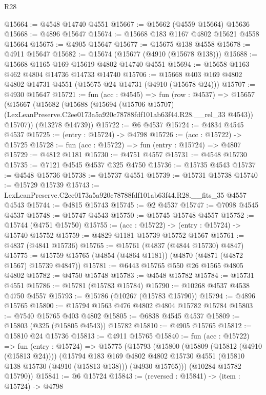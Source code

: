 \begin{lexlean}{R28}
\begin{coremodule}
@15664 := @4548 @14740 @4551
@15667 := @15662 (@4559 @15664) @15636
@15668 := @4896 @15647
@15674 := @15668 @183 @1167 @4802 @15621 @4558 @15664
@15675 := @4905 @15647
@15677 := @15675 @138 @4558
@15678 := @4911 @15647
@15682 := @15674 (@15677 (@4910 (@15678 @138)))
@15688 := @15668 @1165 @169 @15619 @4802 @14740 @4551
@15694 := @15658 @1163 @462 @4804 @14736 @14733 @14740
@15706 := @15668 @403 @169 @4802 @4802 @14731 @4551 (@15675 @24 @14731 (@4910 (@15678 @24)))
@15707 := @4930 @15647
@15721 := fun (acc : @4545) =>
  fun (row : @4537) =>
  @15657
    (@15667
      (@15682
        (@15688
          (@15694
            (@15706 @15707)
            (LexLeanPreserve.C2ee0173a5a920c78788fdf101ab63f44.R28.__rel_33 @4543))
          @15707))
      (@13278 @14739))
@15722 := @6 @4537
@15724 := @4834 @4545 @4537
@15725 := (entry : @15724) -> @4798
@15726 := (acc : @15722) -> @15725
@15728 := fun (acc : @15722) => fun (entry : @15724) => @4807
@15729 := @4812 @1181
@15730 := @4751 @4557
@15731 := @4548 @15730
@15735 := @7121 @4545 @4537 @325 @4750
@15736 := @15735 @4543
@15737 := @4548 @15736
@15738 := @15737 @4551
@15739 := @15731 @15738
@15740 := @15729 @15739
@15743 := LexLeanPreserve.C2ee0173a5a920c78788fdf101ab63f44.R28.__fits_35 @4557 @4543
@15744 := @4815 @15743
@15745 := @2 @4537
@15747 := @7098 @4545 @4537
@15748 := @15747 @4543
@15750 := @15745 @15748 @4557
@15752 := @15744 (@4751 @15750)
@15755 := (acc : @15722) -> (entry : @15724) -> @15740 @15752
@15759 := @4829 @1181 @15739 @15752 @1567
@15761 := @4837 (@4841 @15736)
@15765 := @15761 (@4837 (@4844 @15730) @4847)
@15775 := @15759 @15765 (@4854 (@4864 @1181)) (@4870 (@4871 (@4872 @1567) @15739 @4847))
@15781 := @6443 @15765 @550 @26 @1565 @4805 @4802
@15782 := @4750 @15748
@15783 := @4548 @15782
@15784 := @15731 @4551
@15786 := @15781 (@15783 @15784)
@15790 := @10268 @4537 @4538 @4750 @4557
@15793 := @15786 (@10267 (@15783 @15790))
@15794 := @4896 @15765
@15800 := @15794 @1563 @476 @4802 @4804 @15782 @15784
@15803 := @7540 @15765 @403 @4802
@15805 := @6838 @4545 @4537
@15809 := @15803 (@325 (@15805 @4543)) @15782
@15810 := @4905 @15765
@15812 := @15810 @24 @15736
@15813 := @4911 @15765
@15840 := fun (acc : @15722) =>
  fun (entry : @15724) =>
  @15775
    (@15793
      (@15800
        (@15809 (@15812 (@4910 (@15813 @24))))
        (@15794
          @183
          @169
          @4802
          @4802
          @15730
          @4551
          (@15810 @138 @15730 (@4910 (@15813 @138)))
          (@4930 @15765)))
      (@10284 @15782 @15790))
@15841 := @6 @15724
@15843 := (reversed : @15841) -> (item : @15724) -> @4798

\end{coremodule}
\end{lexlean}
